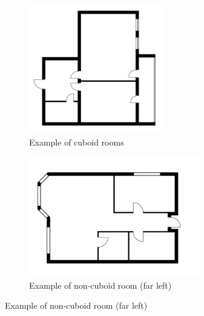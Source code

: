 \begin{figure}[htbp]
    \centering
    \begin{subfigure}[b]{0.38\textwidth}
        \centering
        \includegraphics[width=\textwidth]{images/cuboidfloorplan.png}
        \caption{Example of cuboid rooms}
        \label{fig:cuboidroom}
    \end{subfigure}
    \hfill
    \begin{subfigure}[b]{0.38\textwidth}
        \centering
        \includegraphics[width=\textwidth]{images/noncuboidfloorplan.png}
        \caption{Example of non-cuboid room (far left)}
        \label{fig:noncuboidroom}
    \end{subfigure}
    \label{fig:bothfigures}
\end{figure}

